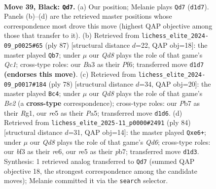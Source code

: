 \documentclass[11pt]{article}
\begin{document}
\clearpage

\begin{figure}[p]\centering
\begin{subfigure}{0.46\textwidth}\centering
\resizebox{\linewidth}{!}{%
\newchessgame
\chessboard[
  setfen={8/pp4kp/6p1/4R3/5PPP/b4B2/6K1/3q4 b - - 2 39},
  showmover=false,
  pgfstyle=straightmove, color=movearrow, markmove={d1-d7}
]}
\caption{}
\end{subfigure}\hfill
\begin{subfigure}{0.46\textwidth}\centering
\resizebox{\linewidth}{!}{%
\newchessgame
\chessboard[
  setfen={2q3k1/p5p1/3R1p1p/5B1P/4P3/6P1/P5K1/8 b - - 5 44},
  showmover=false,
  pgfstyle=straightmove, color=movearrow, markmove={c8-b7}
]}
\caption{}
\end{subfigure}
\\[4pt]
\begin{subfigure}{0.46\textwidth}\centering
\resizebox{\linewidth}{!}{%
\newchessgame
\chessboard[
  setfen={3r4/1p5p/8/P5PP/1P2pk2/2K2b2/4B3/6R1 w - - 2 40},
  showmover=false,
  pgfstyle=straightmove, color=movearrow, markmove={e2-c4}
]}
\caption{}
\end{subfigure}\hfill
\begin{subfigure}{0.46\textwidth}\centering
\resizebox{\linewidth}{!}{%
\newchessgame
\chessboard[
  setfen={4k3/1p6/2bQr3/8/8/p1P4P/P1P2PP1/6K1 w - - 0 43},
  showmover=false,
  pgfstyle=straightmove, color=movearrow, markmove={d6-e6}
]}
\caption{}
\end{subfigure}
\caption{\textbf{Move 39, Black: \texttt{Qd7}.} (a) Our position; Melanie plays \texttt{Qd7} (\texttt{d1d7}). Panels (b)--(d) are the retrieved master positions whose correspondence most drove this move (highest QAP objective among those that transfer to it). (b) Retrieved from \texttt{lichess\_elite\_2024-09\_p0025\#65} (ply 87) [structural distance $d$=22, QAP obj=18]: the master played \texttt{Qb7}; under $\mu$ our \emph{Qd8} plays the role of that game's \emph{Qc1}; cross-type roles: our \emph{B}a3 as their \emph{P}f6; transferred move \texttt{d1d7} \textbf{(endorses this move)}. (c) Retrieved from \texttt{lichess\_elite\_2024-09\_p0017\#184} (ply 78) [structural distance $d$=34, QAP obj=20]: the master played \texttt{Bc4}; under $\mu$ our \emph{Qd8} plays the role of that game's \emph{Be2} (a \textbf{cross-type} correspondence); cross-type roles: our \emph{P}b7 as their \emph{R}g1, our \emph{r}e5 as their \emph{P}a5; transferred move \texttt{d1d6}. (d) Retrieved from \texttt{lichess\_elite\_2025-11\_p0000\#2491} (ply 84) [structural distance $d$=31, QAP obj=14]: the master played \texttt{Qxe6+}; under $\mu$ our \emph{Qd8} plays the role of that game's \emph{Qd6}; cross-type roles: our \emph{b}f3 as their \emph{r}e6, our \emph{r}e5 as their \emph{p}b7; transferred move \texttt{d1d3}. Synthesis: 1 retrieved analog transferred to \texttt{Qd7} (summed QAP objective 18, the strongest correspondence among the candidate moves); Melanie committed it via the \texttt{search} selector.}
\label{fig:thought-m77}
\end{figure}
\end{document}
